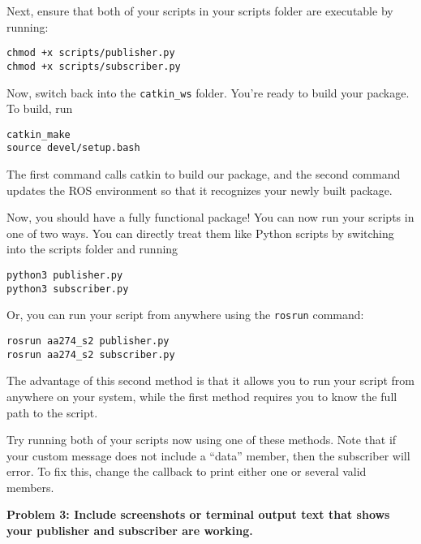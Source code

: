 Next, ensure that both of your scripts in your scripts folder are executable by running:

\begin{lstlisting}
chmod +x scripts/publisher.py
chmod +x scripts/subscriber.py
\end{lstlisting}

Now, switch back into the \texttt{catkin\_ws} folder. You're ready to build your package. To build, run

\begin{lstlisting}
catkin_make
source devel/setup.bash
\end{lstlisting}

The first command calls catkin to build our package, and the second command updates the ROS environment so that it recognizes your newly built package.

Now, you should have a fully functional package! You can now run your scripts in one of two ways. You can directly treat them like Python scripts by switching into the scripts folder and running 

\begin{lstlisting}
python3 publisher.py
python3 subscriber.py
\end{lstlisting}

Or, you can run your script from anywhere using the \texttt{rosrun} command:

\begin{lstlisting}
rosrun aa274_s2 publisher.py
rosrun aa274_s2 subscriber.py
\end{lstlisting}
The advantage of this second method is that it allows you to run your script from anywhere on your system, while the first method requires you to know the full path to the script.

Try running both of your scripts now using one of these methods. Note that if your custom message does not include a ``data'' member, then the subscriber will error. To fix this, change the callback to print either one or several valid members.

\textbf{Problem 3: Include screenshots or terminal output text that shows your publisher and subscriber are working.}


